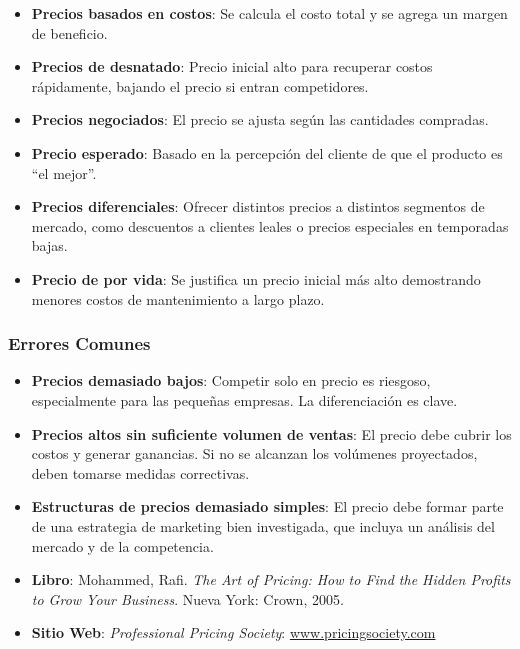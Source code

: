 \documentclass{templateNote}
\begin{document}
\begin{itemize}
    \item \textbf{Precios basados en costos}: Se calcula el costo total y se agrega un margen de beneficio.
    \item \textbf{Precios de desnatado}: Precio inicial alto para recuperar costos rápidamente, bajando el precio si entran competidores.
    \item \textbf{Precios negociados}: El precio se ajusta según las cantidades compradas.
    \item \textbf{Precio esperado}: Basado en la percepción del cliente de que el producto es “el mejor”.
    \item \textbf{Precios diferenciales}: Ofrecer distintos precios a distintos segmentos de mercado, como descuentos a clientes leales o precios especiales en temporadas bajas.
    \item \textbf{Precio de por vida}: Se justifica un precio inicial más alto demostrando menores costos de mantenimiento a largo plazo.
\end{itemize}

\subsubsection*{Errores Comunes}

\begin{itemize}
    \item \textbf{Precios demasiado bajos}: Competir solo en precio es riesgoso, especialmente para las pequeñas empresas. La diferenciación es clave.
    \item \textbf{Precios altos sin suficiente volumen de ventas}: El precio debe cubrir los costos y generar ganancias. Si no se alcanzan los volúmenes proyectados, deben tomarse medidas correctivas.
    \item \textbf{Estructuras de precios demasiado simples}: El precio debe formar parte de una estrategia de marketing bien investigada, que incluya un análisis del mercado y de la competencia.
\end{itemize}

\begin{tcolorbox}[title=Lecturas Adicionales]
    \begin{itemize}
        \item \textbf{Libro}: Mohammed, Rafi. \textit{The Art of Pricing: How to Find the Hidden Profits to Grow Your Business}. Nueva York: Crown, 2005.
        \item \textbf{Sitio Web}: \textit{Professional Pricing Society}: \href{www.pricingsociety.com}{www.pricingsociety.com}
    \end{itemize}
\end{tcolorbox}
\end{document}
